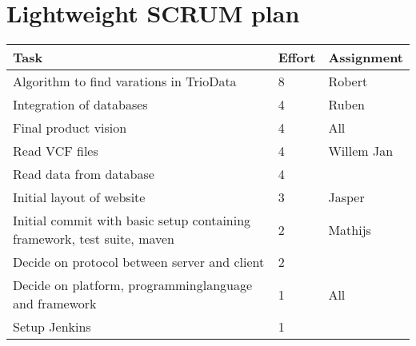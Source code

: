 \documentclass[a4paper]{report}
\begin{document}


\section*{Lightweight SCRUM plan}

\setlength\extrarowheight{5pt}
\begin{table}[ht]
\begin{tabular}{p{8cm}|p{2cm}|p{3cm}}

\textbf{Task} & \textbf{Effort} & \textbf{Assignment}\\
\hline \hline

Algorithm to find varations in TrioData & 8 & Robert\\
Integration of databases & 4 & Ruben\\
Final product vision & 4 & All\\
Read VCF files & 4 & Willem Jan\\
Read data from database & 4 & \\
Initial layout of website & 3 & Jasper\\
Initial commit with basic setup containing framework, test suite, maven & 2 & Mathijs\\
Decide on protocol between server and client & 2 & \\
Decide on platform, programminglanguage and framework & 1 & All\\
Setup Jenkins & 1 & \\

\end{tabular}
\end{table}
\end{document}
